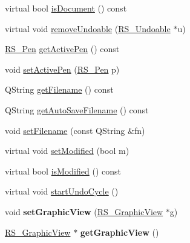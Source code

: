 \begin{DoxyCompactItemize}
\item 
virtual bool \hyperlink{classRS__Document_a3993bf1dd82399ec1b34c358ff153dba}{is\-Document} () const 
\item 
virtual void \hyperlink{classRS__Document_af8dfb197c811c4a0655499447d3e9a82}{remove\-Undoable} (\hyperlink{classRS__Undoable}{R\-S\-\_\-\-Undoable} $\ast$u)
\item 
\hyperlink{classRS__Pen}{R\-S\-\_\-\-Pen} \hyperlink{classRS__Document_ac306d94b55d65065fe2c56455c6b5355}{get\-Active\-Pen} () const 
\item 
void \hyperlink{classRS__Document_a1b95789328f2dd127f244c152271b93b}{set\-Active\-Pen} (\hyperlink{classRS__Pen}{R\-S\-\_\-\-Pen} p)
\item 
Q\-String \hyperlink{classRS__Document_a45f92f4e5ee38bd12c776ee8ce1aaf5d}{get\-Filename} () const 
\item 
Q\-String \hyperlink{classRS__Document_a2ad144d05f1d240dda9d5eebfcfb754d}{get\-Auto\-Save\-Filename} () const 
\item 
void \hyperlink{classRS__Document_aa351aad20b818b353b090a398813b72d}{set\-Filename} (const Q\-String \&fn)
\item 
virtual void \hyperlink{classRS__Document_a18e1ef5e5bbc7d5425bbcffaca272a52}{set\-Modified} (bool m)
\item 
virtual bool \hyperlink{classRS__Document_a5a00e0dba56983d5ff2afe4e364c5c0c}{is\-Modified} () const 
\item 
virtual void \hyperlink{classRS__Document_a10ef1b7c7dbda0913c59c2b533f31b64}{start\-Undo\-Cycle} ()
\item 
\hypertarget{classRS__Document_a0e17f10c919d92b785bf6abf8d357d37}{void {\bfseries set\-Graphic\-View} (\hyperlink{classRS__GraphicView}{R\-S\-\_\-\-Graphic\-View} $\ast$g)}\label{classRS__Document_a0e17f10c919d92b785bf6abf8d357d37}

\item 
\hypertarget{classRS__Document_a8c6cd8dad140fcaf0ecc2ffeb2b653e5}{\hyperlink{classRS__GraphicView}{R\-S\-\_\-\-Graphic\-View} $\ast$ {\bfseries get\-Graphic\-View} ()}\label{classRS__Document_a8c6cd8dad140fcaf0ecc2ffeb2b653e5}

\end{DoxyCompactItemize}
